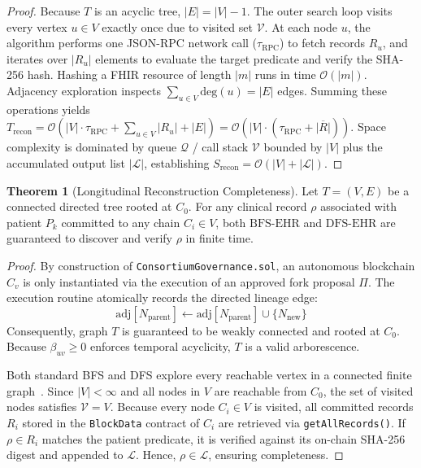 \documentclass[journal]{IEEEtran}
\theoremstyle{definition}
\newtheorem{theorem}{Theorem}
\begin{document}
\begin{proof}
Because $T$ is an acyclic tree, $|E| = |V| - 1$. The outer search loop visits every vertex $u \in V$ exactly once due to visited set $\mathcal{V}$. At each node $u$, the algorithm performs one JSON-RPC network call ($\tau_{\text{RPC}}$) to fetch records $R_u$, and iterates over $|R_u|$ elements to evaluate the target predicate and verify the SHA-256 hash. Hashing a FHIR resource of length $|m|$ runs in time $\mathcal{O}(|m|)$. Adjacency exploration inspects $\sum_{u \in V} \text{deg}(u) = |E|$ edges. Summing these operations yields $T_{\text{recon}} = \mathcal{O}\left(|V| \cdot \tau_{\text{RPC}} + \sum_{u \in V} |R_u| + |E|\right) = \mathcal{O}\left(|V| \cdot (\tau_{\text{RPC}} + \overline{|R|})\right)$. Space complexity is dominated by queue $\mathcal{Q}$ / call stack $\mathcal{V}$ bounded by $|V|$ plus the accumulated output list $|\mathcal{L}|$, establishing $S_{\text{recon}} = \mathcal{O}(|V| + |\mathcal{L}|)$.
\end{proof}

\begin{theorem}[Longitudinal Reconstruction Completeness]
\label{thm:completeness}
Let $T = (V, E)$ be a connected directed tree rooted at $C_0$. For any clinical record $\rho$ associated with patient $P_k$ committed to any chain $C_i \in V$, both $\text{BFS-EHR}$ and $\text{DFS-EHR}$ are guaranteed to discover and verify $\rho$ in finite time.
\end{theorem}

\begin{proof}
By construction of \texttt{ConsortiumGovernance.sol}, an autonomous blockchain $C_v$ is only instantiated via the execution of an approved fork proposal $\Pi$. The execution routine atomically records the directed lineage edge:
\begin{equation}
\text{adj}[N_{\text{parent}}] \leftarrow \text{adj}[N_{\text{parent}}] \cup \{N_{\text{new}}\}
\end{equation}
Consequently, graph $T$ is guaranteed to be weakly connected and rooted at $C_0$. Because $\beta_{uv} \ge 0$ enforces temporal acyclicity, $T$ is a valid arborescence.

Both standard BFS and DFS explore every reachable vertex in a connected finite graph~\cite{cormen2022introduction}. Since $|V| < \infty$ and all nodes in $V$ are reachable from $C_0$, the set of visited nodes satisfies $\mathcal{V} = V$. Because every node $C_i \in V$ is visited, all committed records $R_i$ stored in the \texttt{BlockData} contract of $C_i$ are retrieved via \texttt{getAllRecords()}. If $\rho \in R_i$ matches the patient predicate, it is verified against its on-chain SHA-256 digest and appended to $\mathcal{L}$. Hence, $\rho \in \mathcal{L}$, ensuring completeness.
\end{proof}
\end{document}

